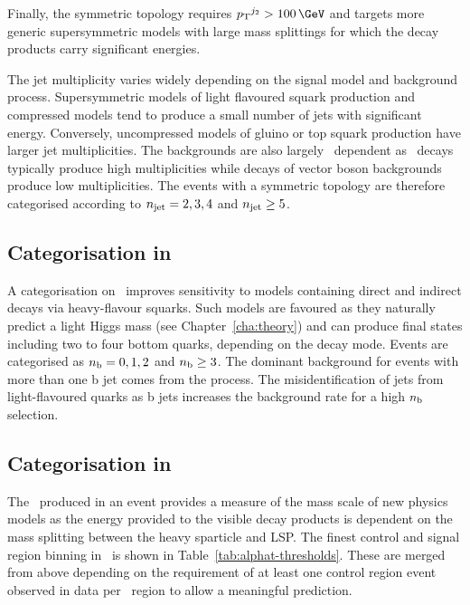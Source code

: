 Finally, the symmetric topology requires $\pt^{j_2} > 100 \,\GeV$ and targets more
generic supersymmetric models with large mass splittings 
for which the decay products carry significant energies.

The jet multiplicity varies widely depending on the signal model and background process. Supersymmetric models of light flavoured squark production and compressed models tend to produce 
a small number of jets with significant energy. Conversely, uncompressed models of gluino or top squark production
have larger jet multiplicities. The backgrounds are also largely \njet~dependent as 
\ttbar~decays typically produce high multiplicities while decays of vector boson backgrounds
produce low multiplicities. The events with a symmetric topology are therefore categorised according
to $n_{\text{jet}} = 2,3,4$ and $n_{\text{jet}} \ge5$.

\subsection{Categorisation in \nb}

A categorisation on \nb~improves sensitivity to models containing direct and indirect
decays via heavy-flavour squarks. Such models are favoured as they naturally
predict a light Higgs mass (see Chapter~\ref{cha:theory}) and can produce
final states including two to four bottom quarks, depending on the decay mode.
Events are categorised as $n_{\mathrm{b}} = 0,1,2$ and $n_{\mathrm{b}} \ge3$. The dominant background for events 
with more than one b jet comes from the \ttbar process. The misidentification of 
jets from light-flavoured quarks as b jets increases the background rate for a high $n_{\mathrm{b}}$ selection.

\subsection{Categorisation in \scalht}

The \scalht~produced in an event provides a measure of the mass scale of 
new physics models as the energy provided to the visible decay products is
dependent on the mass splitting between the heavy sparticle and LSP. 
The finest control and signal region binning in \scalht~is shown in Table~\ref{tab:alphat-thresholds}. 
These are merged from above depending on the requirement of at least one control region
event observed in data per \scalht~region to allow a meaningful prediction.

